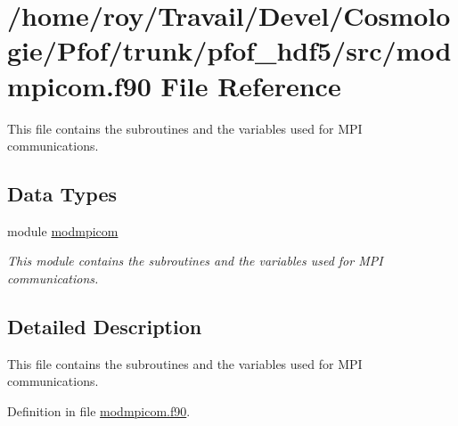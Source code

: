 \hypertarget{pfof__hdf5_2src_2modmpicom_8f90}{\section{/home/roy/\-Travail/\-Devel/\-Cosmologie/\-Pfof/trunk/pfof\-\_\-hdf5/src/modmpicom.f90 File Reference}
\label{pfof__hdf5_2src_2modmpicom_8f90}
}


This file contains the subroutines and the variables used for M\-P\-I communications.  


\subsection*{Data Types}
\begin{DoxyCompactItemize}
\item 
module \hyperlink{classmodmpicom}{modmpicom}
\begin{DoxyCompactList}\small\item\em This module contains the subroutines and the variables used for M\-P\-I communications. \end{DoxyCompactList}\end{DoxyCompactItemize}


\subsection{Detailed Description}
This file contains the subroutines and the variables used for M\-P\-I communications. 

Definition in file \hyperlink{pfof__hdf5_2src_2modmpicom_8f90_source}{modmpicom.\-f90}.

